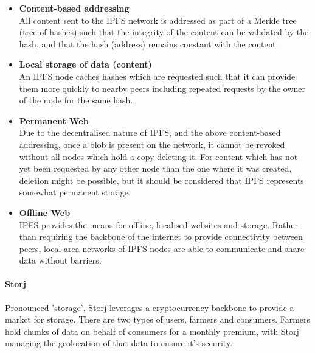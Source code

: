\begin{itemize}
	\item 
    	\textbf{Content-based addressing} \\
        All content sent to the IPFS network is addressed as part of a Merkle tree (tree of hashes) such that the integrity of the content can be validated by the hash, and that the hash (address) remains constant with the content.
    \item 
    	\textbf{Local storage of data (content)} \\
        An IPFS node caches hashes which are requested such that it can provide them more quickly to nearby peers including repeated requests by the owner of the node for the same hash.
    \item 
    	\textbf{Permanent Web} \\
        Due to the decentralised nature of IPFS, and the above content-based addressing, once a blob is present on the network, it cannot be revoked without all nodes which hold a copy deleting it. For content which has not yet been requested by any other node than the one where it was created, deletion might be possible, but it should be considered that IPFS represents somewhat permanent storage.
    \item
    	\textbf{Offline Web} \\
        IPFS provides the means for offline, localised websites and storage. Rather than requiring the backbone of the internet to provide connectivity between peers, local area networks of IPFS nodes are able to communicate and share data without barriers.
\end{itemize}

\paragraph{Storj}

Pronounced 'storage', Storj leverages a cryptocurrency backbone to provide a market for storage. There are two types of users, farmers and consumers. Farmers hold chunks of data on behalf of consumers for a monthly premium, with Storj managing the geolocation of that data to ensure it's security.

